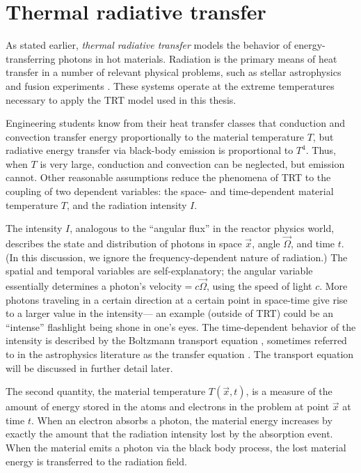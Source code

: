 \section{Thermal radiative transfer}

As stated earlier, \emph{thermal radiative transfer} models the behavior of
energy-transferring photons in hot materials. Radiation is the primary means of
heat transfer in a number of relevant physical problems, such as stellar
astrophysics and fusion experiments \cite{Pom1973,Mih1984}. These systems
operate at the extreme
temperatures necessary to apply the TRT model used in this thesis.

Engineering students know from their heat transfer classes that conduction and
convection transfer energy proportionally to the material
temperature $T$, but radiative energy transfer via black-body emission is
proportional to $T^4$. Thus, when $T$ is very large, conduction and convection
can be neglected, but emission cannot. Other reasonable assumptions
reduce the phenomena of
TRT to the coupling of two dependent variables: the space- and time-dependent material
temperature $T$, and the radiation intensity $I$.

The intensity $I$, analogous to the ``angular flux'' in the reactor physics
world,
describes the state and distribution of photons in space $\vec{x}$, angle
$\vec{\Omega}$, and time $t$.
(In this discussion, we ignore the frequency-dependent nature of radiation.)
The spatial and temporal variables are self-explanatory; the angular
variable essentially determines a photon's velocity${}=c\vec{\Omega}$, using
the speed of light $c$. More photons traveling in a certain direction at a
certain
point in space-time give rise to a larger value in the intensity---%
an example (outside of TRT) could be an ``intense'' flashlight being shone in
one's eyes.  The time-dependent behavior of the intensity is described by the
Boltzmann transport equation \cite{Dud1976}, sometimes referred to in the
astrophysics literature as the transfer equation \cite{Mih1984}.
The transport equation will be discussed in further detail later.

The second quantity, the material temperature $T(\vec{x},t)$, is a measure of
the amount
of energy stored in the atoms and electrons in the problem at point
$\vec{x}$ at time $t$. When an electron
absorbs a photon, the material energy increases by exactly the amount that the
radiation intensity lost by the absorption event. When the material emits a
photon via the black body process, the lost material energy is transferred to
the radiation field.

